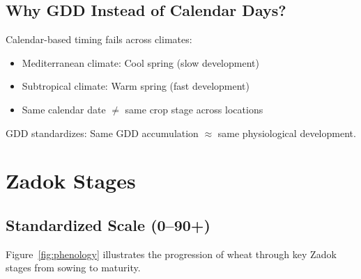 \subsection{Why GDD Instead of Calendar Days?}

\begin{keyconceptbox}
Calendar-based timing fails across climates:
\begin{itemize}
  \item Mediterranean climate: Cool spring (slow development)
  \item Subtropical climate: Warm spring (fast development)
  \item Same calendar date $\ne$ same crop stage across locations
\end{itemize}

GDD standardizes: Same GDD accumulation $\approx$ same physiological development.
\end{keyconceptbox}

\section{Zadok Stages}

\subsection{Standardized Scale (0--90+)}

Figure~\ref{fig:phenology} illustrates the progression of wheat through key Zadok stages from sowing to maturity.

